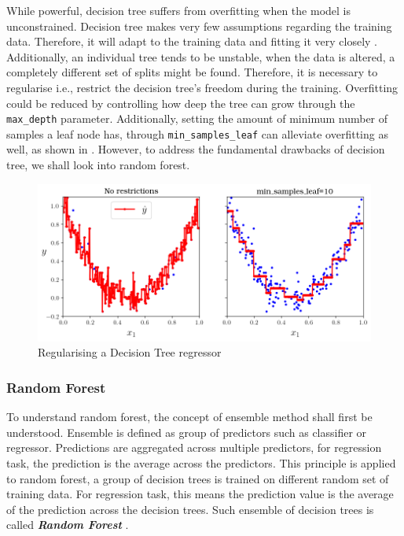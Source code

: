 While powerful, decision tree suffers from overfitting when the model is unconstrained. Decision tree makes very few assumptions regarding the training data. Therefore, it will adapt to the training data and fitting it very closely \citep{Geron.2019}. Additionally, an individual tree tends to be unstable, when the data is altered, a completely different set of splits might be found\citep{Hastie.2009,Kuhn.2013}. Therefore, it is necessary to regularise i.e., restrict the decision tree's freedom during the training. Overfitting could be reduced by controlling how deep the tree can grow through the {\tt max\_depth} parameter. Additionally, setting the amount of minimum number of samples a leaf node has, through {\tt min\_samples\_leaf} can alleviate overfitting as well, as shown in . However, to address the fundamental drawbacks of decision tree, we shall look into random forest.
\begin{figure}
    \centering
        \includegraphics[width=.9\textwidth]{02_figures/fig6_6_paramdepth_geron09.png}
        \caption{Regularising a Decision Tree regressor \citep{Geron.2019}}
        \label{fig:geron6_6}
\end{figure}

\subsubsection{Random Forest}\label{sec:rf_theo}

To understand random forest, the concept of ensemble method shall first be understood. Ensemble is defined as group of predictors such as classifier or regressor. Predictions are aggregated across multiple predictors, for regression task, the prediction is the average across the predictors. This principle is applied to random forest, a group of decision trees is trained on different random set of training data. For regression task, this means the prediction value is the average of the prediction across the decision trees. Such ensemble of decision trees is called \emph{\textbf{Random Forest}} \citep{Hastie.2009,Breiman.2001,TinKamHo.1995}.\\

